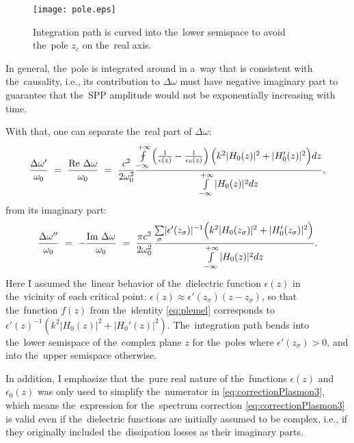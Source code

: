 %
%
\begin{figure}[ptb]
\begin{center}
\texttt{[image: pole.eps]}
\caption{Integration path is curved into the~lower semispace to avoid the~pole $z_c$ on the~real axis.}
\label{fig:polePlasmon}
\end{center}
\end{figure}


In general, the~pole is integrated around in a~way that is consistent with the~causality, i.e., its contribution to $\Delta\omega$ must have negative imaginary part to guarantee that the~SPP amplitude would not be exponentially increasing with time.

With that, one can separate the~real part of $\Delta\omega$:
\begin{equation}
\label{eq:correctionPlasmonRe}
\frac{\Delta\omega'}{\omega_0}~=~\frac{\re\Delta\omega}{\omega_0}~=~\frac{c^2}{2\omega_0^2}\frac{\fint\limits_{-\infty}^{+\infty}\left(\frac{1}{\epsilon(z)}-\frac{1}{\epsilon_0(z)}\right) \Big(k^2|H_0(z)|^2+|H_0'(z)|^2\Big)dz}{\int\limits_{-\infty}^{+\infty} |H_0(z)|^2 dz},
\end{equation}
from its imaginary part:
\begin{equation}
\label{eq:correctionPlasmonIm}
\frac{\Delta\omega''}{\omega_0}~=~-\frac{\textrm{Im }\Delta\omega}{\omega_0}~=~\frac{\pi c^2}{2\omega_0^2}\frac{\underset{\sigma}{\sum} |\epsilon'(z_\sigma)|^{-1} \Big(k^2|H_0(z_\sigma)|^2+|H_0'(z_\sigma)|^2\Big)}{\int\limits_{-\infty}^{+\infty} |H_0(z)|^2 dz}.
\end{equation}
Here I assumed the~linear behavior of the~dielectric function $\epsilon(z)$ in the~vicinity of each critical point: $\epsilon(z)\approx\epsilon'(z_\sigma)\left(z-z_\sigma\right)$, so that the~function $f(z)$ from the~identity \eqref{eq:plemel} corresponds to $\epsilon'(z)^{-1}\left(k^2|H_0(z)|^2+|H_0'(z)|^2\right)$.
The~integration path bends into the~lower semispace of the~complex plane $z$ for the~poles where $\epsilon'(z_\sigma)>0$, and into the~upper semispace otherwise. 

In addition, I emphasize that the~pure real nature of the~functions $\epsilon(z)$ and $\epsilon_0(z)$ was only used to simplify the~numerator in \eqref{eq:correctionPlasmon3}, which means the~expression for the~spectrum correction \eqref{eq:correctionPlasmon3} is valid even if the~dielectric functions are initially assumed to be complex, i.e., if they originally included the~dissipation losses as their imaginary parts.

